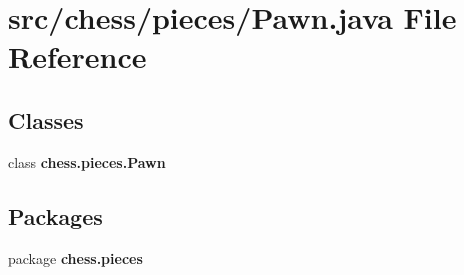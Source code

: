 \section{src/chess/pieces/\+Pawn.java File Reference}
\label{_pawn_8java}
\subsection*{Classes}
\begin{DoxyCompactItemize}
\item 
class {\bf chess.\+pieces.\+Pawn}
\end{DoxyCompactItemize}
\subsection*{Packages}
\begin{DoxyCompactItemize}
\item 
package {\bf chess.\+pieces}
\end{DoxyCompactItemize}
